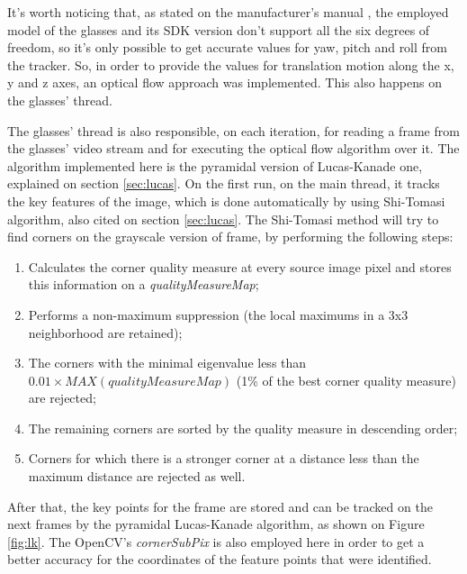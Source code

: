 \documentclass[msc, a4paper, classic, en]{ufbathesis}
\begin{document}
It's worth noticing that, as stated on the manufacturer's manual \cite{vuzixsdk}, the employed model of the glasses and its SDK version don't support all the six degrees of freedom, so it's only possible to get accurate values for yaw, pitch and roll from the tracker. So, in order to provide the values for translation motion along the x, y and z axes, an optical flow approach was implemented. This also happens on the glasses' thread.

The glasses' thread is also responsible, on each iteration, for reading a frame from the glasses' video stream and for executing the optical flow algorithm over it. The algorithm implemented here is the pyramidal version of Lucas-Kanade one, explained on section \ref{sec:lucas}. On the first run, on the main thread, it tracks the key features of the image, which is done automatically by using Shi-Tomasi algorithm, also cited on section \ref{sec:lucas}. The Shi-Tomasi method will try to find corners on the grayscale version of frame, by performing the following steps:

\begin{enumerate}
  \item Calculates the corner quality measure at every source image pixel and stores this information on a \textit{qualityMeasureMap};
  \item Performs a non-maximum suppression (the local maximums in a 3x3 neighborhood are retained);
  \item The corners with the minimal eigenvalue less than $0.01 \times MAX(qualityMeasureMap)$ (1\% of the best corner quality measure) are rejected;
  \item The remaining corners are sorted by the quality measure in descending order;
  \item Corners for which there is a stronger corner at a distance less than the maximum distance are rejected as well.
\end{enumerate}

After that, the key points for the frame are stored and can be tracked on the next frames by the pyramidal Lucas-Kanade algorithm, as shown on Figure \ref{fig:lk}. The OpenCV's \textit{cornerSubPix} is also employed here in order to get a better accuracy for the coordinates of the feature points that were identified.
\end{document}
